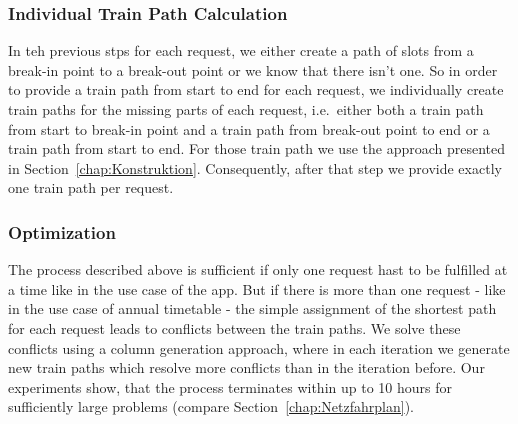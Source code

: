 \subsubsection{Individual Train Path Calculation}
In teh previous stps for each request, we either create a path of slots from a break-in point to a break-out point or we know that there isn't one. So in order to provide a train path from start to end for each request, we individually create train paths for the missing parts of each request, i.e.\ either both a train path from start to break-in point and a train path from break-out point to end or a train path from start to end. For those train path we use the approach presented in Section~\ref{chap:Konstruktion}. Consequently, after that step we provide exactly one train path per request.

\subsubsection{Optimization}
The process described above is sufficient if only one request hast to be fulfilled at a time like in the use case of the app. But if there is more than one request - like in the use case of annual timetable - the simple assignment of the shortest path for each request leads to conflicts between the train paths. We solve these conflicts using a column generation approach, where in each iteration we generate new train paths which resolve more conflicts than in the iteration before. Our experiments show, that the process terminates within up to 10 hours for sufficiently large problems (compare Section~\ref{chap:Netzfahrplan}).